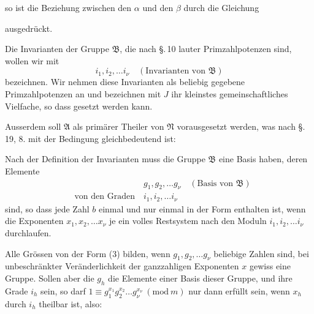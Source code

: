 so ist die Beziehung zwischen den $\alpha$ und den $\beta$ durch die
Gleichung

ausgedrückt.

Die Invarianten der Gruppe $\mathfrak{B}$, die nach \S.\,10 lauter Primzahlpotenzen sind, wollen wir mit
\[
i_1, i_2, \dots i_\nu \quad (\text{Invarianten von } \mathfrak{B})
\]
bezeichnen. Wir nehmen diese Invarianten als beliebig gegebene
Primzahlpotenzen an und bezeichnen mit $J$ ihr kleinstes gemeinschaftliches Vielfache, so dass
gesetzt werden kann.

Ausserdem soll $\mathfrak{A}$ als primärer Theiler von $\mathfrak{N}$ vorausgesetzt werden, was nach \S.\,19, 8. mit der Bedingung gleichbedeutend ist:


Nach der Definition der Invarianten muss die Gruppe $\mathfrak{B}$ eine Basis haben, deren Elemente
\[
\begin{aligned}
&\phantom{\text{von den Graden}} \quad g_1, g_2, \dots g_\nu \quad (\text{Basis von } \mathfrak{B})\\
&\text{von den Graden} \quad i_1, i_2, \dots i_\nu
\end{aligned}
\]
sind, so dass jede Zahl $b$ einmal und nur einmal in der Form
enthalten ist, wenn die Exponenten $x_1, x_2, \dots x_\nu$ je ein volles Restsystem nach den Moduln $i_1, i_2, \dots i_\nu$ durchlaufen.

Alle Grössen von der Form (3) bilden, wenn $g_1, g_2, \dots g_\nu$ beliebige Zahlen sind, bei unbeschränkter Veränderlichkeit der ganzzahligen Exponenten $x$ gewiss eine Gruppe. Sollen aber die $g_h$ die Elemente einer Basis dieser Gruppe, und ihre Grade $i_h$ sein, so darf $1\equiv g_1^{x_1}g_2^{x_2}\dots g_\nu^{x_\nu}\ (\mathrm{mod}\ m)$ nur dann erfüllt sein, wenn $x_h$ durch $i_h$ theilbar ist, also:

